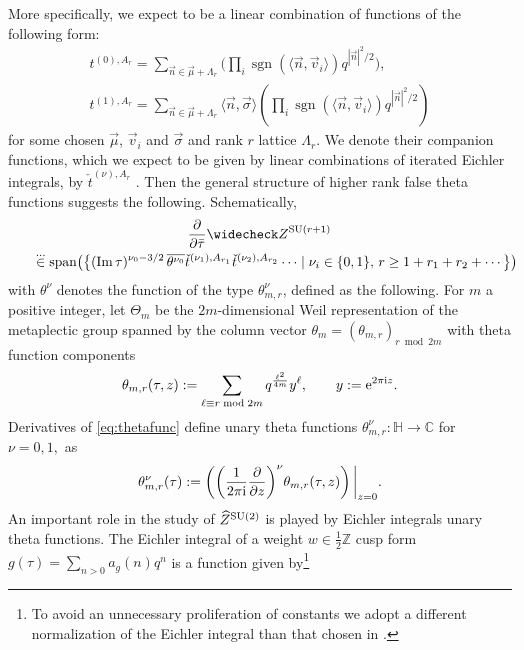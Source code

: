 \documentclass[pdftex]{sigma}
\def\BZ{\mathbb{Z}}
\newcommand{\CC}{\mathbb{C}}
\newcommand{\HH}{\mathbb{H}}
\theoremstyle{definition}
\numberwithin{equation}{section}
\begin{document}
More specifically, we expect  to be a linear combination of functions of the following form:
\begin{gather*}
t_{}^{(0),A_r}= \sum_{\vec n\in \vec\mu + \Lambda_r} \Biggr(\prod_{i}\operatorname{sgn}(\langle \vec n, \vec v_i\rangle) q^{|\vec n|^2/2}\Biggl), \\
 t_{}^{(1),A_r}= \sum_{\vec n\in \vec\mu + \Lambda_r}\langle \vec n, \vec \sigma\rangle \left(\prod_{i}\operatorname{sgn}(\langle \vec n, \vec v_i\rangle) q^{|\vec n|^2/2}\right)
\end{gather*}
for some chosen $\vec \mu$, $\vec v_i$ and $\vec \sigma$ and rank $r$ lattice $\Lambda_r$. We denote their companion functions, which we expect to be given by linear combinations of iterated Eichler integrals, by $\check t^{(\nu),A_r}_{}$ \cite{Bringmann:2021dxg}. Then the general structure of higher rank false theta functions suggests the following. Schematically,
\begin{gather}
 {\frac{\partial}{\partial \bar \tau}}
 {\widecheck Z}^{{\rm SU}(r+1)}\nonumber\\
 \qquad\stackrel{\dots}{\in}\operatorname{span}\bigl(\bigl\{ (\operatorname{Im}\tau)^{\nu_0-3/2}\,\overline{\theta^{\nu_0} }
 \check t^{(\nu_1),A_{r_1}} \check t^{(\nu_2),A_{r_2}} \cdots \mid \nu_i\in \{0,1\},\,r\geq 1+r_1+r_2+\cdots \bigr\}\bigr)\!\!\!\label{general_recursion}
\end{gather}
with $\theta^{\nu}$ denotes the function of the type $\theta^\nu_{m,r}$, defined as the following. For $m$ a positive integer, let $\Theta_m$ be the $2m$-dimensional Weil
representation of the metaplectic group \smash{$\widetilde{{\rm SL}_2(\BZ)}$} spanned by the column
vector $\theta_m=(\theta_{m,r})_{r \bmod 2m}$ with theta function components
\begin{equation}
\label{eq:thetafunc}
 \theta_{m,r}(\tau,z) := \sum_{\ell \equiv r\bmod 2m}
 q^{\frac{\ell^2}{4m}} y^\ell, \qquad y:={\rm e}^{2\pi\mathrm{i}z} .
\end{equation}
Derivatives of \eqref{eq:thetafunc} define unary theta functions $\theta^\nu_{m,r}\colon \HH\to \CC$ for $\nu=0,1,$ as
\begin{equation}\label{dfn:theta}
 \theta^\nu_{m,r}(\tau) := \left(\left({\frac{1}{ 2\pi {\rm i}}} \frac{\partial}{\partial z}\right)^{\nu} \!\theta_{m,r}(\tau,z) \right)\bigg\lvert_{z=0}.
\end{equation}
An important role in the study of $\widehat Z^{{\rm SU}(2)}$ is played by Eichler integrals unary theta functions. The Eichler integral of a weight $w\in \tfrac{1}{2}{\mathbb Z}$ cusp form $g(\tau)=\sum_{n>0}a_g(n) q^n$ is a function given by\footnote{To avoid an unnecessary proliferation of constants we adopt a different normalization of the Eichler integral than that chosen in \cite{cheng20193d}.}
\end{document}
